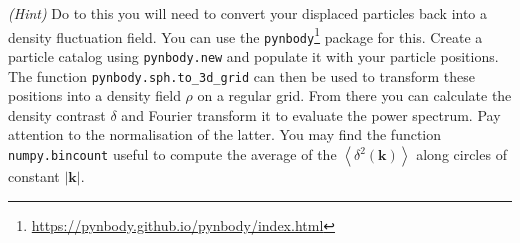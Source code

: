 \documentclass[12pt]{article}
\begin{document}
\emph{(Hint)} Do to this you will need to convert your displaced particles back
into a density fluctuation field. You can use the
\texttt{pynbody}\footnote{\url{https://pynbody.github.io/pynbody/index.html}}
package for this. Create a particle catalog using \texttt{pynbody.new} and
populate it with your particle positions. The function
\texttt{pynbody.sph.to\_3d\_grid} can then be used to transform these positions
into a density field $\rho$ on a regular grid. From there you can calculate the
density contrast $\delta$ and Fourier transform it to evaluate the power
spectrum. Pay attention to the normalisation of the latter. You may find the
function \texttt{numpy.bincount} useful to compute the average of the
$\left<\delta^2(\mathbf{k})\right>$ along circles of constant
$\left|\mathbf{k}\right|$.
\end{document}
